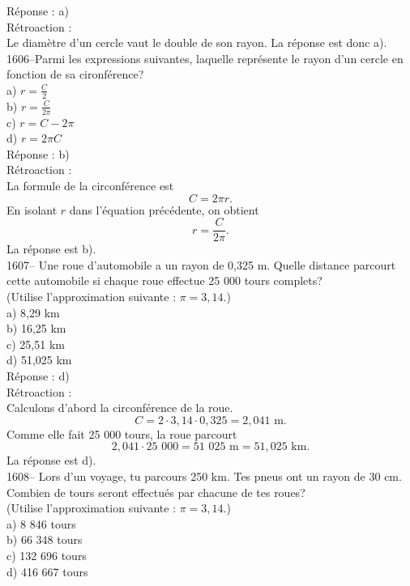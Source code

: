 R\'eponse : a)\\

R\'etroaction :\\
Le diam\`etre d'un cercle vaut le double de son rayon. La r\'eponse est donc
a).\\

1606--Parmi les expressions suivantes, laquelle repr\'esente le rayon
d'un cercle en fonction de sa cironf\'erence?\\
a) $r=\frac{C}{2}$\\[3mm]
b) $r=\frac{C}{2\pi}$\\[3mm]
c) $r=C-2\pi$\\[3mm]
d) $r=2\pi C$\\

R\'eponse : b)\\

R\'etroaction :\\
La formule de la circonf\'erence est $$C=2\pi r.$$
En isolant $r$ dans l'\'equation pr\'ec\'edente, on obtient
$$r=\frac{C}{2\pi}.$$ La r\'eponse est b).\\

1607-- Une roue d'automobile a un rayon de 0,325 m. Quelle distance
parcourt cette automobile si chaque roue effectue 25 000 tours
complets?\\
(Utilise l'approximation suivante : $\pi =3,14.$)\\
a) 8,29 km\\
b) 16,25 km\\
c) 25,51 km\\
d) 51,025 km\\

R\'eponse : d)\\

R\'etroaction :\\
Calculons d'abord la circonf\'erence de la roue.
$$C=2\cdot3,14\cdot0,325=2,041{\textrm{ m.}}$$
Comme elle fait 25 000 tours, la roue parcourt
$$2,041\cdot{\textrm{25 000}}={\textrm{51 025 m}}= 51,025{\textrm{ km.}}$$
La r\'eponse est d).\\

1608-- Lors d'un voyage, tu parcours 250 km. Tes pneus ont un rayon
de 30 cm. Combien de tours seront effectu\'es par chacune de tes
roues?\\
(Utilise l'approximation suivante : $\pi =3,14.$)\\
a) 8 846 tours \\
b) 66 348 tours\\
c) 132 696 tours\\
d) 416 667 tours\\

